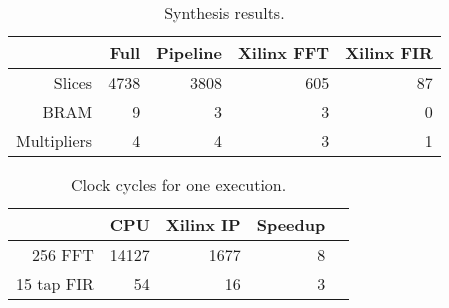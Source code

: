 \documentclass[11pt,twocolumn,technote,a4paper]{IEEEtran}
\begin{document}
\begin{table}[h]
\begin{footnotesize}
\begin{center}
\begin{tabular}{|r|r|r|r|r|}
\hline 
            & Full & Pipeline & Xilinx FFT \cite{xilinx_fft} & Xilinx FIR \cite{xilinx_fir} \\
\hline
\hline
Slices      & 4738 & 3808          & 605 & 87 \\
\hline
BRAM   &    9 &    3          & 3   & 0\\
\hline
Multipliers &    4 &    4          & 3   &1\\
\hline
\hline 
\end{tabular}
\end{center}
\end{footnotesize}
\caption{Synthesis results.}
\label{Tab:Results}
\end{table}

\begin{table}[h]
\begin{footnotesize}
\begin{center}
\begin{tabular}{|r|r|r|r|r|}
\hline 
            & CPU   & Xilinx IP  & Speedup\\
\hline
\hline
256 FFT     & 14127 & 1677 & 8\\
\hline
15 tap FIR  &    54 & 16 & 3\\
\hline
\hline 
\end{tabular}
\end{center}
\end{footnotesize}
\caption{Clock cycles for one execution.}
\label{Tab:Speed}
\end{table}
\end{document}

